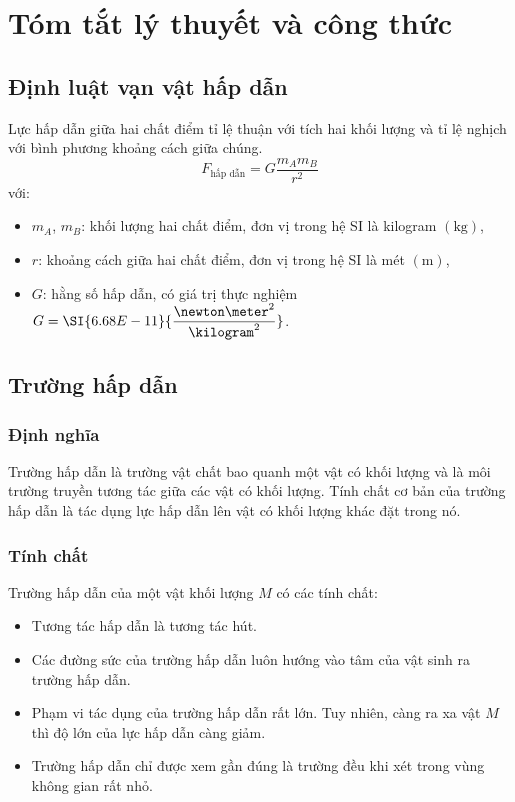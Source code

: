 \chapter{Tóm tắt lý thuyết và công thức}
\section{Định luật vạn vật hấp dẫn}
Lực hấp dẫn giữa hai chất điểm tỉ lệ thuận với tích hai khối lượng và tỉ lệ nghịch với bình phương khoảng cách giữa chúng.
$$F_\text{hấp dẫn}=G\dfrac{m_Am_B}{r^2}$$
với:
\begin{itemize}
	\item $m_A$, $m_B$: khối lượng hai chất điểm, đơn vị trong hệ SI là kilogram $\left(\si{\kilogram}\right)$,
	\item $r$: khoảng cách giữa hai chất điểm, đơn vị trong hệ SI là mét $\left(\si{\meter}\right)$,
	\item $G$: hằng số hấp dẫn, có giá trị thực nghiệm $G=\SI{6.68E-11}{\dfrac{\newton\meter^2}{\kilogram^2}}$.
\end{itemize}
\section{Trường hấp dẫn}
\subsection{Định nghĩa}
Trường hấp dẫn là trường vật chất bao quanh một vật có khối lượng và là môi trường truyền tương tác giữa các vật có khối lượng. Tính chất cơ bản của trường hấp dẫn là tác dụng lực hấp dẫn lên vật có khối lượng khác đặt trong nó.
\subsection{Tính chất}
Trường hấp dẫn của một vật khối lượng $M$ có các tính chất:
\begin{itemize}
	\item Tương tác hấp dẫn là tương tác hút.
	\item Các đường sức của trường hấp dẫn luôn hướng vào tâm của vật sinh ra trường hấp dẫn.
	\item Phạm vi tác dụng của trường hấp dẫn rất lớn. Tuy nhiên, càng ra xa vật $M$ thì độ lớn của lực hấp dẫn càng giảm.
	\item Trường hấp dẫn chỉ được xem gần đúng là trường đều khi xét trong vùng không gian rất nhỏ.
\end{itemize}

